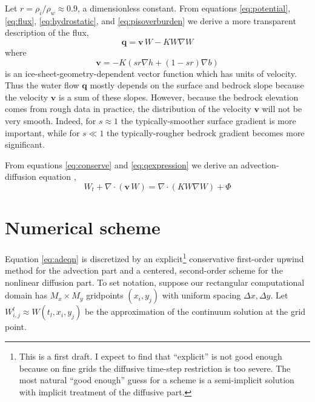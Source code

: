 \documentclass[12pt,final]{amsart}%
\newcommand\bv{\mathbf{v}}
\newcommand\bq{\mathbf{q}}
\newcommand{\Div}{\nabla\cdot}
\newcommand{\grad}{\nabla}
\newcommand{\Wlij}{W^l_{i,j}}
\begin{document}
Let $r = \rho_i / \rho_w \approx 0.9$, a dimensionless constant.  From equations \eqref{eq:potential}, \eqref{eq:flux}, \eqref{eq:hydrostatic}, and \eqref{eq:pisoverburden} we derive a more transparent description of the flux,
\begin{equation} \label{eq:qexpression}
  \bq = \bv\, W - K W \grad W
\end{equation}
where
\begin{equation} \label{eq:vexpression}
  \bv = - K \left(s r \grad h + (1-sr) \grad b\right)
\end{equation}
is an ice-sheet-geometry-dependent vector function which has units of velocity.  Thus the water flow $\bq$ mostly depends on the surface and bedrock slope because the velocity $\bv$ is a sum of these slopes.  However, because the bedrock elevation comes from rough data in practice, the distribution of the velocity $\bv$ will not be very smooth.  Indeed, for $s\approx 1$ the typically-smoother surface gradient is more important, while for $s \ll 1$ the typically-rougher bedrock gradient becomes more significant.

From equations \eqref{eq:conserve} and \eqref{eq:qexpression} we derive an advection-diffusion equation \citep{HundsdorferVerwer2010,MortonMayers},
\begin{equation} \label{eq:adeqn}
  W_t + \Div\left(\bv\, W\right) = \Div \left(K W \grad W\right) + \Phi
\end{equation}


\section{Numerical scheme}

Equation \eqref{eq:adeqn} is discretized by an explicit\footnote{This is a first draft.  I expect to find that ``explicit'' is not good enough because on fine grids the diffusive time-step restriction is too severe.  The most natural ``good enough'' guess for a scheme is a semi-implicit solution with implicit treatment of the diffusive part.} conservative first-order upwind method for the advection part and a centered, second-order scheme for the nonlinear diffusion part.  To set notation, suppose our rectangular computational domain has $M_x \times M_y$ gridpoints $(x_i,y_j)$ with uniform spacing $\Delta x,\Delta y$.  Let $\Wlij \approx W(t_l,x_i,y_j)$ be the approximation of the continuum solution at the grid point.
\end{document}
